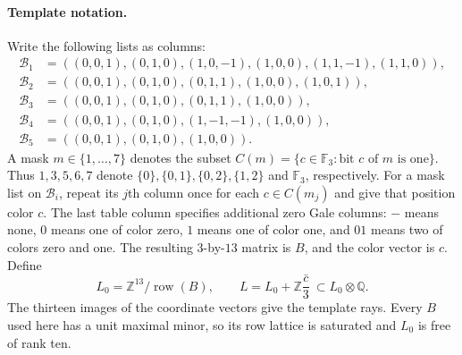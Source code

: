 \documentclass[11pt,a4paper]{article}
\theoremstyle{definition}
\begin{document}
\paragraph{Template notation.}
Write the following lists as columns:
\[
\begin{split}
\mathcal B_1&=((0,0,1),(0,1,0),(1,0,-1),(1,0,0),
                  (1,1,-1),(1,1,0)),\\
\mathcal B_2&=((0,0,1),(0,1,0),(0,1,1),(1,0,0),(1,0,1)),\\
\mathcal B_3&=((0,0,1),(0,1,0),(0,1,1),(1,0,0)),\\
\mathcal B_4&=((0,0,1),(0,1,0),(1,-1,-1),(1,0,0)),\\
\mathcal B_5&=((0,0,1),(0,1,0),(1,0,0)).
\end{split}                                                    \tag{TG.4}
\]
A mask $m\in\{1,\ldots,7\}$ denotes the subset
$C(m)=\{c\in\mathbb F_3:\text{bit }c\text{ of }m\text{ is one}\}$.
Thus $1,3,5,6,7$ denote $\{0\},\{0,1\},\{0,2\},\{1,2\}$
and $\mathbb F_3$, respectively.
For a mask list on $\mathcal B_i$, repeat its $j$th column once for
each $c\in C(m_j)$ and give that position color $c$.
The last table column specifies additional zero Gale columns:
$-$ means none, $0$ means one of color zero, $1$ means one of color
one, and $01$ means two of colors zero and one.
The resulting $3$-by-$13$ matrix is $B$, and the color vector is $c$.
Define
\[
 L_0=\mathbb Z^{13}/\operatorname{row}(B),\qquad
 L=L_0+\mathbb Z\frac{\bar c}{3}\ \subset L_0\otimes\mathbb Q.
                                                               \tag{TG.5}
\]
The thirteen images of the coordinate vectors give the template rays.
Every $B$ used here has a unit maximal minor, so its row lattice is
saturated and $L_0$ is free of rank ten.
\end{document}
